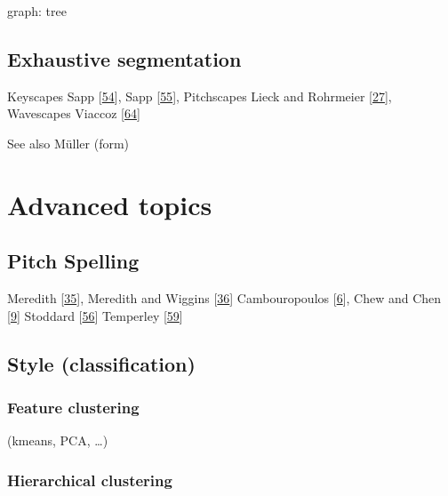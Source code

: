 \documentclass[letterpaper,10pt,english]{sphinxmanual}
\begin{document}
\sphinxAtStartPar
graph: tree


\section{Exhaustive segmentation}
\label{\detokenize{5_segmentation:exhaustive-segmentation}}
\sphinxAtStartPar
Keyscapes Sapp {[}\hyperlink{cite.8_bibliography:id37}{54}{]}, Sapp {[}\hyperlink{cite.8_bibliography:id38}{55}{]},
Pitchscapes Lieck and Rohrmeier {[}\hyperlink{cite.8_bibliography:id32}{27}{]},
Wavescapes Viaccoz  {[}\hyperlink{cite.8_bibliography:id51}{64}{]}

\sphinxAtStartPar
See also Müller (form)


\chapter{Advanced topics}
\label{\detokenize{6_advanced:advanced-topics}}\label{\detokenize{6_advanced::doc}}

\section{Pitch Spelling}
\label{\detokenize{6_advanced:pitch-spelling}}\label{\detokenize{6_advanced:id1}}
\sphinxAtStartPar
Meredith {[}\hyperlink{cite.8_bibliography:id27}{35}{]}, Meredith and Wiggins {[}\hyperlink{cite.8_bibliography:id26}{36}{]}
Cambouropoulos {[}\hyperlink{cite.8_bibliography:id28}{6}{]}, Chew and Chen {[}\hyperlink{cite.8_bibliography:id29}{9}{]}
Stoddard  {[}\hyperlink{cite.8_bibliography:id30}{56}{]}
Temperley {[}\hyperlink{cite.8_bibliography:id31}{59}{]}


\section{Style (classification)}
\label{\detokenize{6_advanced:style-classification}}

\subsection{Feature clustering}
\label{\detokenize{6_advanced:feature-clustering}}
\sphinxAtStartPar
(k\sphinxhyphen{}means, PCA, …)


\subsection{Hierarchical clustering}
\label{\detokenize{6_advanced:hierarchical-clustering}}
\end{document}
